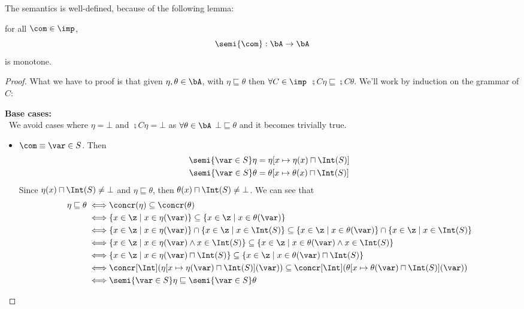 The semantics is well-defined, because of the following lemma:

\begin{lemma}\label{le:monotone}
   for all \(\com \in \imp\), \[\semi{\com}: \bA \to \bA\] is
   monotone.
\end{lemma}

\begin{proof}
  What we have to proof is that given \(\eta, \theta \in \bA\), with
  \(\eta \sqsubseteq \theta\) then \(\forall C \in \imp\)
  \(\semi{C}\eta \sqsubseteq \semi{C}\theta\). We'll work by induction
  on the grammar of \(C\):
  
  \noindent
  \textbf{Base cases:}\ \\ \ We avoid cases where \(\eta = \bot\) and
  \(\semi{C}\eta = \bot\) as \(\forall \theta \in \bA\) \(\bot
  \sqsubseteq \theta\) and it becomes trivially true.
  \begin{itemize}
  \item \(\com \equiv \var \in S\). Then
    \begin{align*}
      \semi{\var \in S}\eta & = \eta[x\mapsto\eta(x) \sqcap \Int(S)] \\
      \semi{\var \in S}\theta & = \theta[x\mapsto \theta(x) \sqcap \Int(S)]
    \end{align*}
    Since \(\eta(x) \sqcap \Int(S) \neq \bot\) and \(\eta \sqsubseteq
    \theta\), then \(\theta(x) \sqcap \Int(S) \neq \bot\). We can see
    that
    \begin{align*}
      \eta \sqsubseteq \theta \iff & \concr(\eta) \subseteq \concr(\theta) \\
      \iff & \{x\in\z \mid x \in \eta(\var)\} \subseteq \{x\in\z \mid x \in \theta(\var)\} \\
      \iff & \{x\in\z \mid x \in \eta(\var)\} \cap \{x \in \z \mid x \in \Int(S)\} \subseteq \{x\in\z \mid x \in \theta(\var)\} \cap \{x \in \z \mid x \in \Int(S)\} \\
      \iff & \{x \in \z \mid x \in \eta(\var) \wedge x \in \Int(S)\} \subseteq \{x \in \z \mid x \in \theta(\var) \wedge x \in \Int(S)\} \\
      \iff & \{x \in \z \mid x \in \eta(\var) \sqcap \Int(S)\} \subseteq \{x \in \z \mid x \in \theta(\var) \sqcap \Int(S)\} \\
      \iff & \concr[\Int](\eta[x\mapsto \eta(\var) \sqcap \Int(S)](\var)) \subseteq \concr[\Int](\theta[x\mapsto \theta(\var) \sqcap \Int(S)](\var)) \\
      \iff & \semi{\var \in S}\eta \sqsubseteq \semi{\var \in S}\theta

\end{align*}
\end{itemize}
\end{proof}
